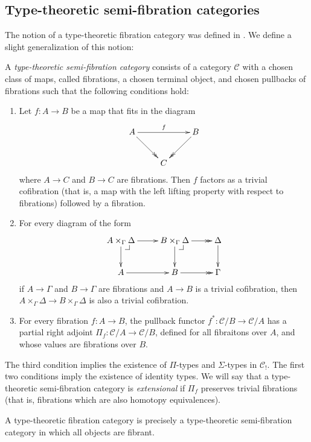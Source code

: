 \documentclass[reqno]{amsart}
\makeatletter
\theoremstyle{definition}
\theoremstyle{remark}
\newcommand{\scat}[1]{\mathcal{#1}}
\numberwithin{figure}{section}
\newcommand{\pb}[1][dr]{\save*!/#1-1.2pc/#1:(-1,1)@^{|-}\restore}
\makeatother
\begin{document}
\subsection{Type-theoretic semi-fibration categories}

The notion of a type-theoretic fibration category was defined in \cite[Definition~2.1]{shul-inv}.
We define a slight generalization of this notion:
\begin{defn}
A \emph{type-theoretic semi-fibration category} consists of a category $\scat{C}$ with a chosen class of maps, called fibrations, a chosen terminal object, and chosen pullbacks of fibrations such that the following conditions hold:
\begin{enumerate}
\item Let $f : A \to B$ be a map that fits in the diagram
\[ \xymatrix{ A \ar[rr]^f \ar@{->>}[dr] &   & B \ar@{->>}[dl] \\
                                        & C
            } \]
where $A \to C$ and $B \to C$ are fibrations. Then $f$ factors as a trivial cofibration (that is, a map with the left lifting property with respect to fibrations) followed by a fibration.
\item For every diagram of the form
\[ \xymatrix{ A \times_\Gamma \Delta \ar[r] \ar[d] \pb & B \times_\Gamma \Delta \ar[d] \ar@{->>}[r] \pb & \Delta \ar[d] \\
              A \ar[r] & B \ar@{->>}[r] & \Gamma
            } \]
if $A \to \Gamma$ and $B \to \Gamma$ are fibrations and $A \to B$ is a trivial cofibration, then $A \times_\Gamma \Delta \to B \times_\Gamma \Delta$ is also a trivial cofibration.
\item For every fibration $f : A \to B$, the pullback functor $f^* : \scat{C}/B \to \scat{C}/A$ has a partial right adjoint $\Pi_f : \scat{C}/A \to \scat{C}/B$, defined for all fibraitons over $A$, and whose values are fibrations over $B$.
\end{enumerate}
\end{defn}

The third condition implies the existence of $\Pi$-types and $\Sigma$-types in $\scat{C}_!$.
The first two conditions imply the existence of identity types.
We will say that a type-theoretic semi-fibration category is \emph{extensional} if $\Pi_f$ preserves trivial fibrations (that is, fibrations which are also homotopy equivalences).

\begin{remark}
A type-theoretic fibration category is precisely a type-theoretic semi-fibration category in which all objects are fibrant.
\end{remark}
\end{document}
